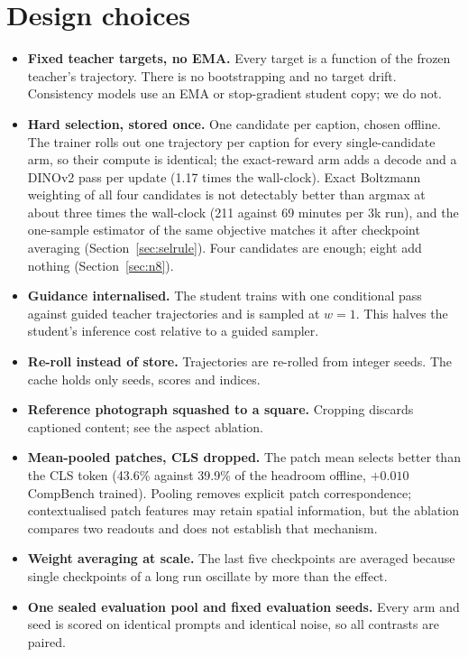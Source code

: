 \documentclass[11pt,a4paper]{article}
\begin{document}
\section{Design choices}
\begin{itemize}
\item \textbf{Fixed teacher targets, no EMA.} Every target is a function of the frozen teacher's trajectory. There is no bootstrapping and no target drift. Consistency models use an EMA or stop-gradient student copy; we do not.
\item \textbf{Hard selection, stored once.} One candidate per caption, chosen offline. The trainer rolls out one trajectory per caption for every single-candidate arm, so their compute is identical; the exact-reward arm adds a decode and a DINOv2 pass per update (1.17 times the wall-clock). Exact Boltzmann weighting of all four candidates is not detectably better than argmax at about three times the wall-clock (211 against 69 minutes per 3k run), and the one-sample estimator of the same objective matches it after checkpoint averaging (Section~\ref{sec:selrule}). Four candidates are enough; eight add nothing (Section~\ref{sec:n8}).
\item \textbf{Guidance internalised.} The student trains with one conditional pass against guided teacher trajectories and is sampled at $w=1$. This halves the student's inference cost relative to a guided sampler.
\item \textbf{Re-roll instead of store.} Trajectories are re-rolled from integer seeds. The cache holds only seeds, scores and indices.
\item \textbf{Reference photograph squashed to a square.} Cropping discards captioned content; see the aspect ablation.
\item \textbf{Mean-pooled patches, CLS dropped.} The patch mean selects better than the CLS token (43.6\% against 39.9\% of the headroom offline, $+0.010$ CompBench trained). Pooling removes explicit patch correspondence; contextualised patch features may retain spatial information, but the ablation compares two readouts and does not establish that mechanism.
\item \textbf{Weight averaging at scale.} The last five checkpoints are averaged because single checkpoints of a long run oscillate by more than the effect.
\item \textbf{One sealed evaluation pool and fixed evaluation seeds.} Every arm and seed is scored on identical prompts and identical noise, so all contrasts are paired.
\end{itemize}
\end{document}
